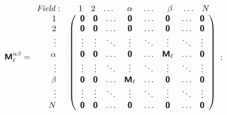 \begin{equation}
\bm{\mathsf{M}}_\ell^{\alpha \beta} =
\begin{array}{r l} \mathit{Field:} &
\begin{array}{c c c c c c c c}
\hphantom{~~}1 & 2 & \ldots & \hphantom{~~}\alpha & \hphantom{\,}\ldots & \hphantom{~~}\beta & \hphantom{\,}\ldots & N
\end{array} \\
\begin{array}{r}
1 \\ 2 \\ \vdots \\ \alpha \\ \vdots \\ \beta \\ \vdots \\ N
\end{array} &
\left(
\begin{array}{c c c c c c c c}
\bm{\mathsf{0}} & \bm{\mathsf{0}} & \ldots & \bm{\mathsf{0}} & \ldots & \bm{\mathsf{0}} & \ldots & \bm{\mathsf{0}} \\
\bm{\mathsf{0}} & \bm{\mathsf{0}} & \ldots & \bm{\mathsf{0}} & \ldots & \bm{\mathsf{0}} & \ldots & \bm{\mathsf{0}} \\
\vdots & \vdots & \ddots & \vdots & \ddots & \vdots & \ddots & \vdots \\
\bm{\mathsf{0}} & \bm{\mathsf{0}} & \ldots & \bm{\mathsf{0}} & \ldots & \bm{\mathsf{M}}_\ell & \ldots & \bm{\mathsf{0}} \\
\vdots & \vdots & \ddots & \vdots & \ddots & \vdots & \ddots & \vdots \\
\bm{\mathsf{0}} & \bm{\mathsf{0}} & \ldots & \bm{\mathsf{M}}_\ell & \ldots & \bm{\mathsf{0}} & \ldots & \bm{\mathsf{0}} \\
\vdots & \vdots & \ddots & \vdots & \ddots & \vdots & \ddots & \vdots \\
\bm{\mathsf{0}} & \bm{\mathsf{0}} & \ldots & \bm{\mathsf{0}} & \ldots & \bm{\mathsf{0}} & \ldots & \bm{\mathsf{0}}
\end{array}
\right)
\end{array};
\end{equation}

